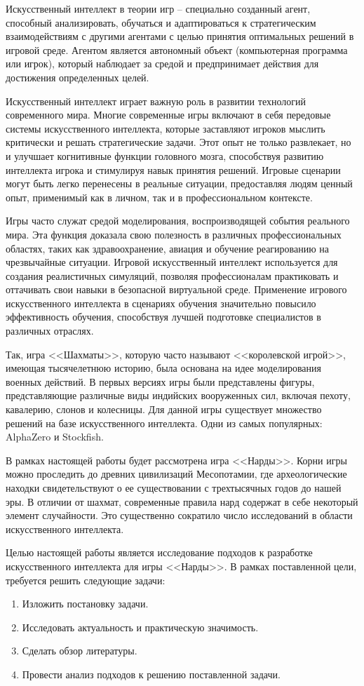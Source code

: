 Искусственный интеллект в теории игр -- специально созданный агент, способный анализировать, обучаться и адаптироваться к стратегическим взаимодействиям с другими агентами с целью принятия оптимальных решений в игровой среде. Агентом является автономный объект (компьютерная программа или игрок), который наблюдает за средой и предпринимает действия для достижения определенных целей.

Искусственный интеллект играет важную роль в развитии технологий современного мира. Многие современные игры включают в себя передовые системы искусственного интеллекта, которые заставляют игроков мыслить критически и решать стратегические задачи. Этот опыт не только развлекает, но и улучшает когнитивные функции головного мозга, способствуя развитию интеллекта игрока и стимулируя навык принятия решений. Игровые сценарии могут быть легко перенесены в реальные ситуации, предоставляя людям ценный опыт, применимый как в личном, так и в профессиональном контексте.

Игры часто служат средой моделирования, воспроизводящей события реального мира. Эта функция доказала свою полезность в различных профессиональных областях, таких как здравоохранение, авиация и обучение реагированию на чрезвычайные ситуации. Игровой искусственный интеллект используется для создания реалистичных симуляций, позволяя профессионалам практиковать и оттачивать свои навыки в безопасной виртуальной среде. Применение игрового искусственного интеллекта в сценариях обучения значительно повысило эффективность обучения, способствуя лучшей подготовке специалистов в различных отраслях.

Так, игра <<Шахматы>>, которую часто называют <<королевской игрой>>, имеющая тысячелетнюю историю, была основана на идее моделирования военных действий. В первых версиях игры были представлены фигуры, представляющие различные виды индийских вооруженных сил, включая пехоту, кавалерию, слонов и колесницы. Для данной игры существует множество решений на базе искусственного интеллекта. Одни из самых популярных: AlphaZero и Stockfish.

В рамках настоящей работы будет рассмотрена игра <<Нарды>>. Корни игры можно проследить до древних цивилизаций Месопотамии, где археологические находки свидетельствуют о ее существовании с трехтысячных годов до нашей эры. В отличии от шахмат, современные правила нард содержат в себе некоторый элемент случайности. Это существенно сократило число исследований в области искусственного интеллекта.

Целью настоящей работы является исследование подходов к разработке искусственного интеллекта для игры <<Нарды>>. В рамках поставленной цели, требуется решить следующие задачи:
\begin{enumerate}
\item Изложить постановку задачи.
\item Исследовать актуальность и практическую значимость.
\item Сделать обзор литературы.
\item Провести анализ подходов к решению поставленной задачи.
\end{enumerate}
